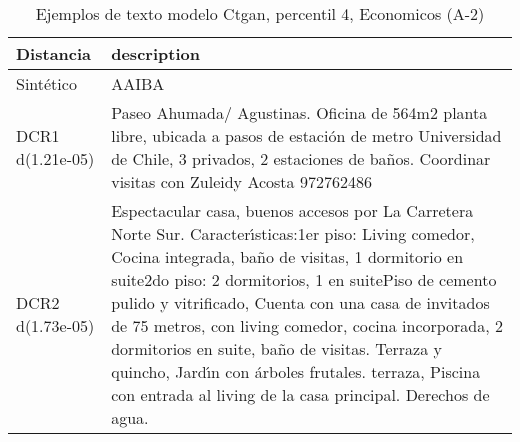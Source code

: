 \begin{table}[H]
\centering
\fontsize{10}{14}\selectfont
\caption{Ejemplos de texto modelo Ctgan, percentil 4, Economicos (A-2)}
\label{table-example-economicos-a-2-ctgan-4p-text}
\begin{tabular}{|l|m{35em}|}
\hline
\rowcolor[gray]{0.8}
Distancia & description \\
\hline Sintético & AAIBA \\
\hline DCR1 d(1.21e-05) & Paseo Ahumada/ Agustinas. Oficina de 564m2 planta libre, ubicada a pasos de estaci\'on de metro Universidad de Chile, 3 privados, 2 estaciones de ba\~nos. Coordinar visitas con Zuleidy Acosta 972762486 \\
\hline DCR2 d(1.73e-05) & Espectacular casa, buenos accesos por La Carretera Norte Sur. Caracter{\'\i}sticas:1er piso: Living comedor, Cocina integrada, ba\~no de visitas, 1 dormitorio en suite2do piso: 2 dormitorios, 1 en suitePiso de cemento pulido y vitrificado, Cuenta con una casa de invitados de 75 metros, con living comedor, cocina incorporada, 2 dormitorios en suite, ba\~no de visitas. Terraza y quincho, Jard{\'\i}n con \'arboles frutales. terraza, Piscina con entrada al living de la casa principal. Derechos de agua. \\
\hline
\end{tabular}
\end{table}
